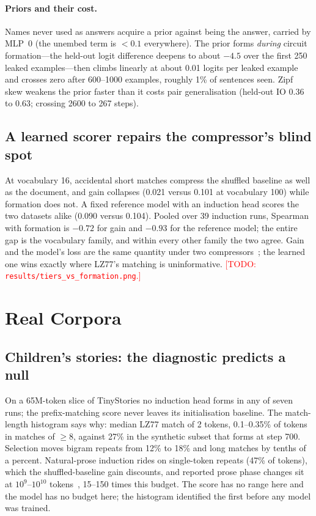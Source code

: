 \documentclass[11pt]{article}
\newcommand{\todo}[1]{\textcolor{red}{[TODO: #1]}}
\begin{document}
\paragraph{Priors and their cost.}
Names never used as answers acquire a prior against being the answer,
carried by MLP~0 (the unembed term is $<0.1$ everywhere). The prior forms
\emph{during} circuit formation---the held-out logit difference deepens to
about $-4.5$ over the first 250 leaked examples---then climbs linearly at
about 0.01 logits per leaked example and crosses zero after 600--1000
examples, roughly 1\% of sentences seen. Zipf skew weakens the prior faster
than it costs pair generalisation (held-out IO 0.36 to 0.63; crossing 2600
to 267 steps).

\subsection{A learned scorer repairs the compressor's blind spot}
\label{sec:tiers}

At vocabulary 16, accidental short matches compress the shuffled baseline
as well as the document, and gain collapses (0.021 versus 0.101 at
vocabulary 100) while formation does not. A fixed reference model with an
induction head scores the two datasets alike (0.090 versus 0.104). Pooled
over 39 induction runs, Spearman with formation is $-0.72$ for gain and
$-0.93$ for the reference model; the entire gap is the vocabulary family,
and within every other family the two agree. Gain and the model's loss are
the same quantity under two compressors~\citep{deletang2023compression};
the learned one wins exactly where LZ77's matching is uninformative.
\todo{\texttt{results/tiers\_vs\_formation.png}.}

\section{Real Corpora}\label{sec:real}

\subsection{Children's stories: the diagnostic predicts a null}
\label{sec:tinystories}

On a 65M-token slice of TinyStories no induction head forms in any of seven
runs; the prefix-matching score never leaves its initialisation baseline.
The match-length histogram says why: median LZ77 match of 2 tokens,
0.1--0.35\% of tokens in matches of $\geq8$, against 27\% in the synthetic
subset that forms at step 700. Selection moves bigram repeats from 12\% to
18\% and long matches by tenths of a percent. Natural-prose induction rides
on single-token repeats (47\% of tokens), which the shuffled-baseline gain
discounts, and reported prose phase changes sit at $10^9$--$10^{10}$
tokens~\citep{olsson2022induction}, 15--150 times this budget. The score
has no range here and the model has no budget here; the histogram
identified the first before any model was trained.
\end{document}
